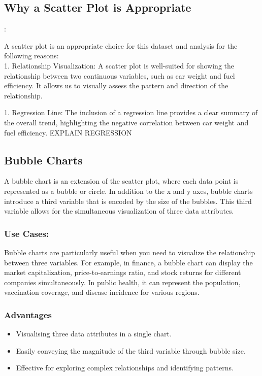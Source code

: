 \documentclass{article}\usepackage[]{graphicx}\usepackage[]{xcolor}
\begin{document}
\subsection{Why a Scatter Plot is Appropriate}:

A scatter plot is an appropriate choice for this dataset and analysis for the following reasons:\\

1. Relationship Visualization: A scatter plot is well-suited for showing the relationship between two continuous variables, such as car weight and fuel efficiency. It allows us to visually assess the pattern and direction of the relationship.

1. Regression Line: The inclusion of a regression line provides a clear summary of the overall trend, highlighting the negative correlation between car weight and fuel efficiency.
EXPLAIN REGRESSION


\subsection{Bubble Charts}
A bubble chart is an extension of the scatter plot, where each data point is represented as a bubble or circle. In addition to the x and y axes, bubble charts introduce a third variable that is encoded by the size of the bubbles. This third variable allows for the simultaneous visualization of three data attributes.

\subsubsection{Use Cases:}
Bubble charts are particularly useful when you need to visualize the relationship between three variables. For example, in finance, a bubble chart can display the market capitalization, price-to-earnings ratio, and stock returns for different companies simultaneously. In public health, it can represent the population, vaccination coverage, and disease incidence for various regions.

\subsubsection{Advantages}
\begin{itemize}
    \item Visualising three data attributes in a single chart.
    \item Easily conveying the magnitude of the third variable through bubble size. 
    \item Effective for exploring complex relationships and identifying patterns. 
\end{itemize}
\end{document}
